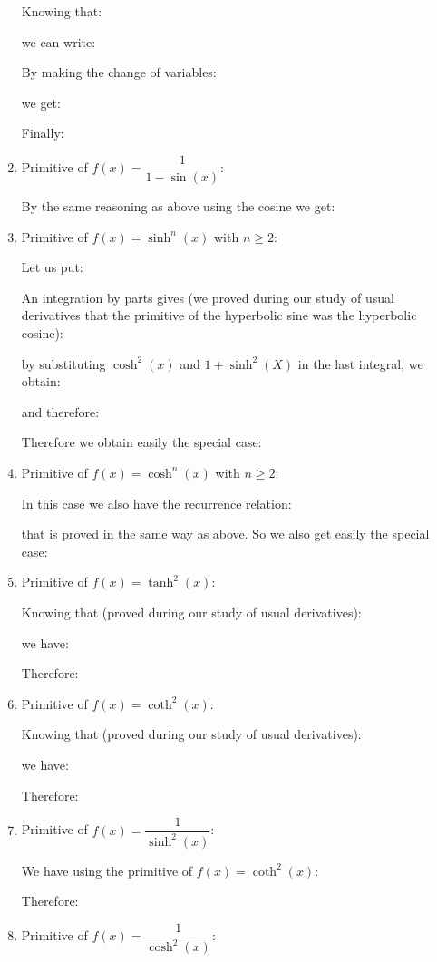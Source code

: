 \begin{enumerate}
		Knowing that:
		
		we can write:
		
		By making the change of variables:
		
		we get:
		
		Finally:
		
		\item  Primitive of $f(x)=\dfrac{1}{1-\sin(x)}$:
		
		By the same reasoning as above using the cosine we get:
		
		
		\item Primitive of $f(x)=\sinh^n(x)$ with $n \geq 2$:
		
		Let us put:
		
		An integration by parts gives (we proved during our study of usual derivatives that the primitive of the hyperbolic sine was the hyperbolic cosine):
		
		by substituting $\cosh^2(x)$  and $1+\sinh^2(X)$ in the last integral, we obtain:
		
		and therefore:
		
		Therefore we obtain easily the special case:
		 
		\item Primitive of $f(x)=\cosh^n(x)$ with $n \geq 2$:
		
		In this case we also have the recurrence relation:
		
		that is proved in the same way as above. So we also get easily the special case:
		
		
		\item Primitive of $f(x)=\tanh^2(x)$:
		
		Knowing that (proved during our study of usual derivatives):
		
		we have:
		
		Therefore:
		
		
		\item Primitive of $f(x)=\coth^2(x)$:
		
		Knowing that (proved during our study of usual derivatives):
		
		we have:
		
		Therefore:
		
		
		\item Primitive of $f(x)=\dfrac{1}{\sinh^2(x)}$:
		
		We have using the primitive of $f(x)=\coth^2(x)$:
		
		Therefore:
		
		
		\item Primitive of $f(x)=\dfrac{1}{\cosh^2(x)}$:
		

\end{enumerate}
